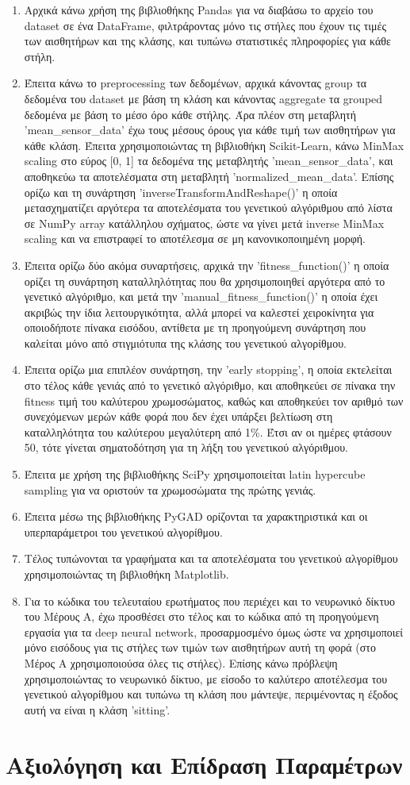 \documentclass[12pt,a4paper]{article}
\begin{document}
\begin{enumerate}
    \item Αρχικά κάνω χρήση της βιβλιοθήκης Pandas για να διαβάσω το αρχείο του dataset σε ένα DataFrame, φιλτράροντας μόνο τις στήλες που έχουν τις τιμές των αισθητήρων και της κλάσης, και τυπώνω στατιστικές πληροφορίες για κάθε στήλη.
    \item Έπειτα κάνω το preprocessing των δεδομένων, αρχικά κάνοντας group τα δεδομένα του dataset με βάση τη κλάση και κάνοντας aggregate τα grouped δεδομένα με βάση το μέσο όρο κάθε στήλης. Άρα πλέον στη μεταβλητή 'mean\_sensor\_data' έχω τους μέσους όρους για κάθε τιμή των αισθητήρων για κάθε κλάση. Έπειτα χρησιμοποιώντας τη βιβλιοθήκη Scikit-Learn, κάνω MinMax scaling στο εύρος [0, 1] τα δεδομένα της μεταβλητής 'mean\_sensor\_data', και αποθηκεύω τα αποτελέσματα στη μεταβλητή 'normalized\_mean\_data'. Επίσης ορίζω και τη συνάρτηση 'inverseTransformAndReshape()' η οποία μετασχηματίζει αργότερα τα αποτελέσματα του γενετικού αλγόριθμου από λίστα σε ΝumPy array κατάλληλου σχήματος, ώστε να γίνει μετά inverse MinMax scaling και να επιστραφεί το αποτέλεσμα σε μη κανονικοποιημένη μορφή.
    \item Έπειτα ορίζω δύο ακόμα συναρτήσεις, αρχικά την 'fitness\_function()' η οποία ορίζει τη συνάρτηση καταλληλότητας που θα χρησιμοποιηθεί αργότερα από το γενετικό αλγόριθμο, και μετά την 'manual\_fitness\_function()' η οποία έχει ακριβώς την ίδια λειτουργικότητα, αλλά μπορεί να καλεστεί χειροκίνητα για οποιοδήποτε πίνακα εισόδου, αντίθετα με τη προηγούμενη συνάρτηση που καλείται μόνο από στιγμιότυπα της κλάσης του γενετικού αλγορίθμου.
    \item Έπειτα ορίζω μια επιπλέον συνάρτηση, την 'early stopping', η οποία εκτελείται στο τέλος κάθε γενιάς από το γενετικό αλγόριθμο, και αποθηκεύει σε πίνακα την fitness τιμή του καλύτερου χρωμοσώματος, καθώς και αποθηκεύει τον αριθμό των συνεχόμενων μερών κάθε φορά που δεν έχει υπάρξει βελτίωση στη καταλληλότητα του καλύτερου μεγαλύτερη από 1\%. Έτσι αν οι ημέρες φτάσουν 50, τότε γίνεται σηματοδότηση για τη λήξη του γενετικού αλγόριθμου.
    \item Έπειτα με χρήση της βιβλιοθήκης SciPy χρησιμοποιείται latin hypercube sampling για να οριστούν τα χρωμοσώματα της πρώτης γενιάς.
    \item Έπειτα μέσω της βιβλιοθήκης PyGAD ορίζονται τα χαρακτηριστικά και οι υπερπαράμετροι του γενετικού αλγορίθμου.
    \item Τέλος τυπώνονται τα γραφήματα και τα αποτελέσματα του γενετικού αλγορίθμου χρησιμοποιώντας τη βιβλιοθήκη Matplotlib.
    \item Για το κώδικα του τελευταίου ερωτήματος που περιέχει και το νευρωνικό δίκτυο του Μέρους Α, έχω προσθέσει στο τέλος και το κώδικα από τη προηγούμενη εργασία για τα deep neural network, προσαρμοσμένο όμως ώστε να χρησιμοποιεί μόνο εισόδους για τις στήλες των τιμών των αισθητήρων αυτή τη φορά (στο Μέρος Α χρησιμοποιούσα όλες τις στήλες). Επίσης κάνω πρόβλεψη χρησιμοποιώντας το νευρωνικό δίκτυο, με είσοδο το καλύτερο αποτέλεσμα του γενετικού αλγορίθμου και τυπώνω τη κλάση που μάντεψε, περιμένοντας η έξοδος αυτή να είναι η κλάση 'sitting'.
\end{enumerate}

\section{Αξιολόγηση και Επίδραση Παραμέτρων}
\end{document}
